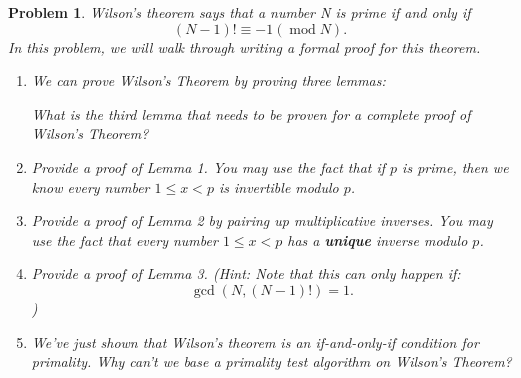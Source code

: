 \documentclass[10pt]{article}
\newtheorem{problem}{\sc\color{cit}Problem}
\begin{document}
\newpage


\begin{problem}
Wilson’s theorem says that a number N is prime if and only if 
\[
    (N-1)!\equiv -1 (\operatorname{mod} N).
\]
In this problem, we will walk through writing a formal proof for this theorem. 
\begin{enumerate}
    \item[(a)] We can prove Wilson's Theorem by proving three lemmas:
    
    What is the third lemma that needs to be proven for a complete proof of Wilson's Theorem?
    
    \item[(b)] Provide a proof of Lemma 1. You may use the fact that if $p$ is prime, then we know every number $1 \leq x < p$ is invertible modulo $p$.

    \item[(c)] Provide a proof of Lemma 2 by pairing up multiplicative inverses. You may use the fact that every number $1 \leq x < p$ has a \textbf{unique} inverse modulo $p$. 
    
    \item[(d)] Provide a proof of Lemma 3. (Hint: Note that this can only happen if: 
    \[
        \operatorname{gcd}(N, (N - 1)!) = 1.
    \]
    )

    \item[(e)] We've just shown that Wilson’s theorem is an if-and-only-if condition for primality. Why can't we base a primality test algorithm on Wilson's Theorem? 
\end{enumerate}

\end{problem}
\end{document}

